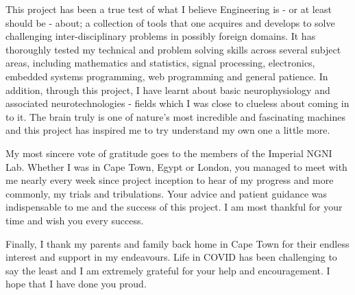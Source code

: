 \noindent
This project has been a true test of what I believe Engineering is - or at least should be - about; a collection of tools that one acquires and develops to solve challenging inter-disciplinary problems in possibly foreign domains. It has thoroughly tested my technical and problem solving skills across several subject areas, including mathematics and statistics, signal processing, electronics, embedded systems programming, web programming and general patience. In addition, through this project, I have learnt about basic neurophysiology and associated neurotechnologies - fields which I was close to clueless about coming in to it. The brain truly is one of nature's most incredible and fascinating machines and this project has inspired me to try understand my own one a little more.
\vspace{0.4cm}

\noindent
My most sincere vote of gratitude goes to the members of the Imperial NGNI Lab. Whether I was in Cape Town, Egypt or London, you managed to meet with me nearly every week since project inception to hear of my progress and more commonly, my trials and tribulations. Your advice and patient guidance was indispensable to me and the success of this project. I am most thankful for your time and wish you every success. \vspace{0.4cm}

\noindent
Finally, I thank my parents and family back home in Cape Town for their endless interest and support in my endeavours. Life in COVID has been challenging to say the least and I am extremely grateful for your help and encouragement. I hope that I have done you proud.